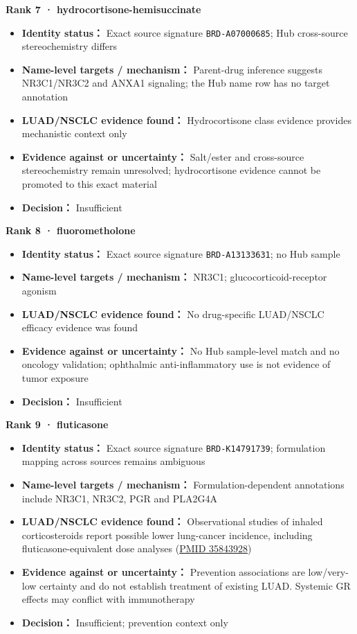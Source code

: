 \documentclass[
  10pt,
]{ctexart}
\providecommand{\tightlist}{%
  \setlength{\itemsep}{0pt}\setlength{\parskip}{0pt}}
\begin{document}
\textbf{Rank 7 · hydrocortisone-hemisuccinate}

\begin{itemize}
\tightlist
\item
  \textbf{Identity status：} Exact source signature
  \texttt{BRD-A07000685}; Hub cross-source stereochemistry differs
\item
  \textbf{Name-level targets / mechanism：} Parent-drug inference
  suggests NR3C1/NR3C2 and ANXA1 signaling; the Hub name row has no
  target annotation
\item
  \textbf{LUAD/NSCLC evidence found：} Hydrocortisone class evidence
  provides mechanistic context only
\item
  \textbf{Evidence against or uncertainty：} Salt/ester and cross-source
  stereochemistry remain unresolved; hydrocortisone evidence cannot be
  promoted to this exact material
\item
  \textbf{Decision：} Insufficient
\end{itemize}

\textbf{Rank 8 · fluorometholone}

\begin{itemize}
\tightlist
\item
  \textbf{Identity status：} Exact source signature
  \texttt{BRD-A13133631}; no Hub sample
\item
  \textbf{Name-level targets / mechanism：} NR3C1;
  glucocorticoid-receptor agonism
\item
  \textbf{LUAD/NSCLC evidence found：} No drug-specific LUAD/NSCLC
  efficacy evidence was found
\item
  \textbf{Evidence against or uncertainty：} No Hub sample-level match
  and no oncology validation; ophthalmic anti-inflammatory use is not
  evidence of tumor exposure
\item
  \textbf{Decision：} Insufficient
\end{itemize}

\textbf{Rank 9 · fluticasone}

\begin{itemize}
\tightlist
\item
  \textbf{Identity status：} Exact source signature
  \texttt{BRD-K14791739}; formulation mapping across sources remains
  ambiguous
\item
  \textbf{Name-level targets / mechanism：} Formulation-dependent
  annotations include NR3C1, NR3C2, PGR and PLA2G4A
\item
  \textbf{LUAD/NSCLC evidence found：} Observational studies of inhaled
  corticosteroids report possible lower lung-cancer incidence, including
  fluticasone-equivalent dose analyses
  (\href{https://pubmed.ncbi.nlm.nih.gov/35843928/}{PMID 35843928})
\item
  \textbf{Evidence against or uncertainty：} Prevention associations are
  low/very-low certainty and do not establish treatment of existing
  LUAD. Systemic GR effects may conflict with immunotherapy
\item
  \textbf{Decision：} Insufficient; prevention context only
\end{itemize}
\end{document}
